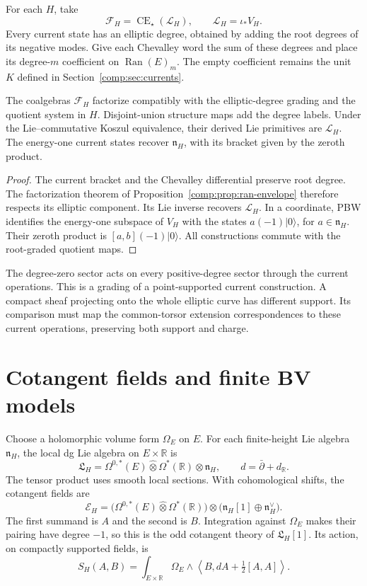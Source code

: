 \begin{construction}
For each \(H\), take
\[
 \mathcal F_H=\operatorname{CE}_\star(\mathcal L_H),
 \qquad \mathcal L_H=\iota_*V_H.
\]
Every current state has an elliptic degree, obtained by adding the
root degrees of its negative modes. Give each Chevalley word the
sum of these degrees and place its degree-\(m\) coefficient on
\(\operatorname{Ran}(E)_m\). The empty coefficient remains the
unit \(K\) defined in Section~\ref{comp:sec:currents}.
\end{construction}

\begin{theorem}
The coalgebras \(\mathcal F_H\) factorize compatibly with the
elliptic-degree grading and the quotient system in \(H\).
Disjoint-union structure maps add the degree labels. Under the
Lie--commutative Koszul equivalence, their derived Lie primitives
are \(\mathcal L_H\). The energy-one current states recover
\(\mathfrak n_H\), with its bracket given by the zeroth product.
\end{theorem}
\begin{proof}
The current bracket and the Chevalley differential preserve root
degree. The factorization theorem of
Proposition~\ref{comp:prop:ran-envelope} therefore respects its
elliptic component. Its Lie inverse recovers \(\mathcal L_H\).
In a coordinate, PBW identifies the energy-one subspace of \(V_H\)
with the states \(a(-1)|0\rangle\), for \(a\in\mathfrak n_H\).
Their zeroth product is \([a,b](-1)|0\rangle\). All constructions
commute with the root-graded quotient maps.
\end{proof}

The degree-zero sector acts on every positive-degree sector through
the current operations. This is a grading of a point-supported
current construction. A compact sheaf projecting onto the whole
elliptic curve has different support. Its comparison must map the
common-torsor extension correspondences to these current operations,
preserving both support and charge.

\section{Cotangent fields and finite BV models}
Choose a holomorphic volume form \(\Omega_E\) on \(E\).
For each finite-height Lie algebra \(\mathfrak n_H\), the local
dg Lie algebra on \(E\times\mathbb R\) is
\[
 \mathfrak L_H=\Omega^{0,*}(E)\widehat\otimes
             \Omega^*(\mathbb R)\otimes\mathfrak n_H,
 \qquad d=\bar\partial+d_{\mathbb R}.
\]
The tensor product uses smooth local sections. With cohomological
shifts, the cotangent fields are
\[
 \mathcal E_H=
 \bigl(\Omega^{0,*}(E)\widehat\otimes\Omega^*(\mathbb R)\bigr)
 \otimes\bigl(\mathfrak n_H[1]\oplus\mathfrak n_H^\vee\bigr).
\]
The first summand is \(A\) and the second is \(B\).
Integration against \(\Omega_E\) makes their pairing have
degree \(-1\), so this is the odd cotangent theory of
\(\mathfrak L_H[1]\).
Its action, on compactly supported fields, is
\[
 S_H(A,B)=\int_{E\times\mathbb R}\Omega_E\wedge
 \left\langle B,dA+\tfrac12[A,A]\right\rangle.
\]


